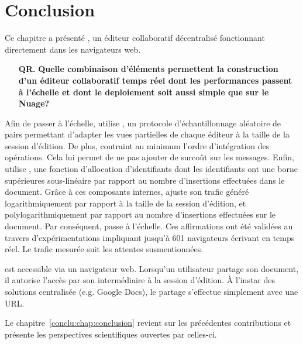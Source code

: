
\section{Conclusion}
\label{editor:sec:conclusion}

Ce chapitre a présenté \CRATE, un éditeur collaboratif décentralisé fonctionnant
directement dans les navigateurs web.

\begin{itemize}
\item [\textbf{QR.}] \textbf{Quelle combinaison d'éléments permettent la construction
  d'un éditeur collaboratif temps réel dont les performances passent à l'échelle
  et dont le deploiement soit aussi simple que sur le Nuage?}
\end{itemize}

Afin de passer à l'échelle, \CRATE utilise \SPRAY, un protocole
d'échantillonnage aléatoire de pairs permettant d'adapter les vues partielles de
chaque éditeur à la taille de la session d'édition. De plus, \CRATE contraint au
minimum l'ordre d'intégration des opérations. Cela lui permet de ne pas ajouter
de surcoût sur les messages. Enfin, \CRATE utilise \LSEQ, une fonction
d'allocation d'identifiants dont les identifiants ont une borne supérieures
sous-linéaire par rapport au nombre d'insertions effectuées dans le
document. Grâce à ces composants internes, \CRATE ajuste son trafic généré
logarithmiquement par rapport à la taille de la session d'édition, et
polylogarithmiquement par rapport au nombre d'insertions effectuées sur le
document. Par conséquent, \CRATE passe à l'échelle. Ces affirmations ont été
validées au travers d'expérimentations impliquant jusqu'à 601 navigateurs
écrivant en temps réel. Le trafic mesurée suit les attentes susmentionnées.

\CRATE est accessible via un navigateur web. Lorsqu'un utilisateur partage son
document, il autorise l'accès par son intermédiaire à la session d'édition. À
l'instar des solutions centralisée (e.g. Google Docs), le partage s'effectue
simplement avec une URL.

Le chapitre~\ref{conclu:chap:conclusion} revient sur les précédentes
contributions et présente les perspectives scientifiques ouvertes par celles-ci.
